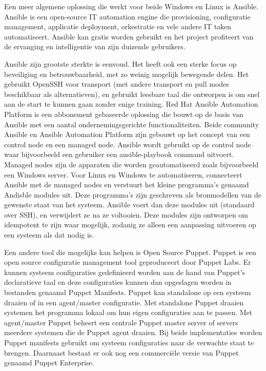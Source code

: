 Een meer algemene oplossing die werkt voor beide Windows en Linux is Ansible.
Ansible is een open-source IT automation engine die provisioning, configuratie management, applicatie deployment, orkestratie en vele andere IT taken automatiseert.
Ansible kan gratis worden gebruikt en het project profiteert van de ervanging en intelligentie van zijn duizende gebruikers. \autocite{Ansible}

Ansible zijn grootste sterkte is eenvoud. Het heeft ook een sterke focus op beveiliging en betrouwbaarheid, met zo weinig mogelijk bewegende delen. Het gebruikt OpenSSH voor transport (met andere transport en pull modes beschikbaar als alternatieven), en gebruikt leesbare taal die ontworpen is om snel aan de start te kunnen gaan zonder enige training.
Red Hat Ansible Automation Platform is een abbonement gebaseerde oplossing die bouwt op de basis van Ansible met een aantal ondernemingsgerichte functionaliteiten.
Beide community Ansible en Ansible Automation Platform zijn gebouwt op het concept van een control node en een managed node. Ansible wordt gebruikt op de control node waar bijvoorbeeld een gebruiker een ansible-playbook command uitvoert. Managed nodes zijn de apparaten die worden geautomatiseerd zoals bijvoorbeeld een Windows server.
Voor Linux en Windows te automatiseren, connecteert Ansible met de managed nodes en verstuurt het kleine programma's genaamd Andisble modules uit. Deze programma's zijn geschreven als bronmodellen van de gewenste staat van het systeem. Ansible voert dan deze modules uit (standaard over SSH), en verwijdert ze na ze voltooien.
Deze modules zijn ontworpen om idempotent te zijn waar mogelijk, zodanig ze alleen een aanpassing uitvoeren op een systeem als dat nodig is. \autocite{AnisbleHow} \break

Een andere tool die mogelijks kan helpen is Open Source Puppet.
Puppet is een open source configuratie management tool geproduceert door Puppet Labs. Er kunnen systeem configuraties gedefinieerd worden aan de hand van Puppet's declaratieve taal en deze configuraties kunnen dan opgeslagen worden in bestanden genaamd Puppet Manifests.
Puppet kan standalone op een systeem draaien of in een agent/master configuratie. Met standalone Puppet draaien systemen het programma lokaal om hun eigen configuraties aan te passen. Met agent/master Puppet beheert een centrale Puppet master server of servers meerdere systemen die de Puppet agent draaien.
Bij beide implementaties worden Puppet manifests gebruikt om systeem configuraties naar de verwachte staat te brengen. Daarnaast bestaat er ook nog een commerciële versie van Puppet genaamd Puppet Enterprise. \autocite{Puppet} \break

